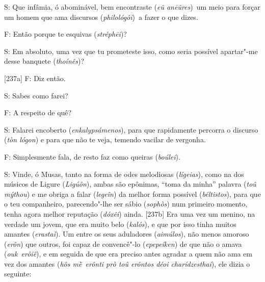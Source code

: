  

S: Que infâmia, ó abominável, bem encontraste (\emph{eũ anēũres})~um
meio para forçar um homem que ama discursos (\emph{philológôi})~a fazer
o que dizes.

 

F: Então porque te esquivas (\emph{stréphēi})?

 

S: Em absoluto, uma vez que tu prometeste isso, como seria possível
apartar"-me desse banquete (\emph{thoínês})?

 

[237a] F: Diz então.

 

S: Sabes como farei?

 

F: A respeito de quê?

 

S: Falarei encoberto (\emph{enkalypsámenos}), para que rapidamente
percorra o discurso (\emph{tòn lógon}) e para que não te veja, temendo
vacilar de vergonha.

 

F: Simplesmente fala, de resto faz como queiras (\emph{boúlei}).

 

S: Vinde, ó Musas, tanto na forma de odes melodiosas (\emph{lígeias}),
como na dos músicos de Ligure (\emph{Ligúôn}), ambas são epônimas,
``toma da minha'' palavra (\emph{toû mýthou}) e me obriga a falar
(\emph{legeîn}) da melhor forma possível (\emph{béltistos}), para que o
teu companheiro, parecendo"-lhe ser sábio (\emph{sophòs}) num primeiro
momento, tenha agora melhor reputação (\emph{dóxêi}) ainda. [237b]
Era uma vez um menino, na verdade um jovem, que era muito belo
(\emph{kalós}), e que por isso tinha muitos amantes (\emph{erastaì}). Um
entre os seus aduladores (\emph{aimúlos}), não menos amoroso
(\emph{erôn}) que outros, foi capaz de convencê"-lo (\emph{epepeíken}) de
que não o amava (\emph{ouk}~\emph{erôiê}), e em seguida de que era
preciso antes agradar a quem não ama em vez dos amantes (\emph{hôs
mḕ~erônti prò toû erôntos déoi charídzesthai}), ele dizia o seguinte:

 

